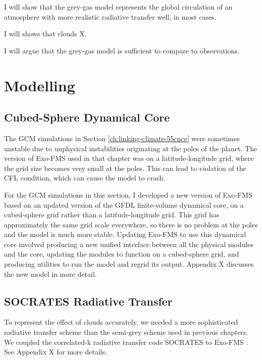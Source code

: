 I will show that the grey-gas model represents the global circulation of an atmosphere with more realistic radiative transfer well, in most cases.

I will shows that clouds X.

I will argue that the grey-gas model is sufficient to compare to observations.







\section{Modelling}


\subsection{Cubed-Sphere Dynamical Core}

The GCM simulations in Section \ref{ch:linking-climate-55cnce} were sometimes unstable due to unphysical instabilities originating at the poles of the planet. The version of Exo-FMS used in that chapter was on a latitude-longitude grid, where the grid size becomes very small at the poles. This can lead to violation of the CFL condition, which can cause the model to crash.

For the GCM simulations in this section, I developed a new version of Exo-FMS based on an updated version of the GFDL finite-volume dynamical core, on a cubed-sphere grid rather than a latitude-longitude grid. This grid has approximately the same grid scale everywhere, so there is no problem at the poles and the model is much more stable. Updating Exo-FMS to use this dynamical core involved producing a new unified interface between all the physical modules and the core, updating the modules to function on a cubed-sphere grid, and producing utilities to run the model and regrid its output. Appendix X discusses the new model in more detail.


\subsection{SOCRATES Radiative Transfer}

To represent the effect of clouds accurately, we needed a more sophisticated radiative transfer scheme than the semi-grey scheme used in previous chapters. We coupled the correlated-k radiative transfer code SOCRATES to Exo-FMS \citep{Edwards1996socrates}. See Appendix X for more details.

